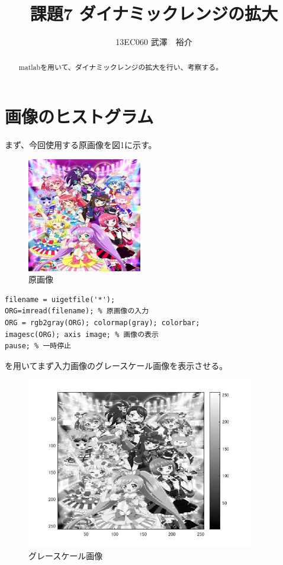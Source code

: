 \documentclass{jsarticle}
\begin{document}
\title{課題7 ダイナミックレンジの拡大}
\author{13EC060 武澤　裕介}
\maketitle
\begin{abstract}
matlabを用いて、ダイナミックレンジの拡大を行い、考察する。
\end{abstract}
\section{画像のヒストグラム}
まず、今回使用する原画像を図1に示す。


\begin{figure}[htbp]
 \begin{center}
  \includegraphics[width=5cm,height=5cm]{sample.jpg}
 \end{center}
 \caption{原画像}
\end{figure}

\begin{lstlisting}[basicstyle=\ttfamily\footnotesize, frame=single]
filename = uigetfile('*');
ORG=imread(filename); % 原画像の入力
ORG = rgb2gray(ORG); colormap(gray); colorbar;
imagesc(ORG); axis image; % 画像の表示
pause; % 一時停止
 \end{lstlisting}
を用いてまず入力画像のグレースケール画像を表示させる。

\newpage
\begin{figure}[htbp]
 \begin{center}
  \includegraphics[width=10cm]{kadai7-0.jpg}
 \end{center}
 \caption{グレースケール画像}
\end{figure}
\end{document}
